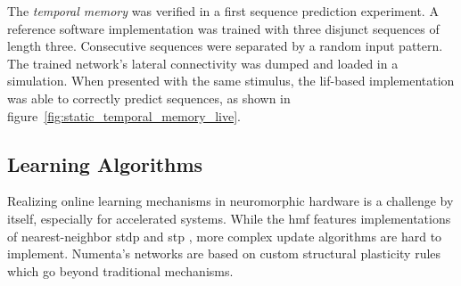 
The \emph{temporal memory} was verified in a first sequence prediction experiment. A reference software implementation was trained with three disjunct sequences of length three. Consecutive sequences were separated by a random input pattern. The trained network's lateral connectivity was dumped and loaded in a simulation. When presented with the same stimulus, the \gls{lif}-based implementation was able to correctly predict sequences, as shown in figure~\ref{fig:static_temporal_memory_live}.

\begin{figure*}[p]
	\begin{center}
		
	\end{center}
	\caption{A \gls{lif} neuron based temporal memory implementation correctly predicting different patterns. Predicted cells are marked blue, active cells in purple. The network spans 128 columns with each of their eight \gls{htm} cells collecting distal stimuli via two dendritic segments. Connectivity for the distal inputs was configured externally. The model was presented three disjunct sequences of size three. The individual patterns were separated by a random input \gls{sdr}.}
	\label{fig:static_temporal_memory_live}
\end{figure*}

\subsection{Learning Algorithms}

Realizing online learning mechanisms in neuromorphic hardware is a challenge by itself, especially for accelerated systems. While the \gls{hmf} features implementations of nearest-neighbor \gls{stdp} and \gls{stp} \citep{friedmann13plasticity,billaudelle14stp}, more complex update algorithms are hard to implement. Numenta's networks are based on custom structural plasticity rules which go beyond traditional mechanisms.

